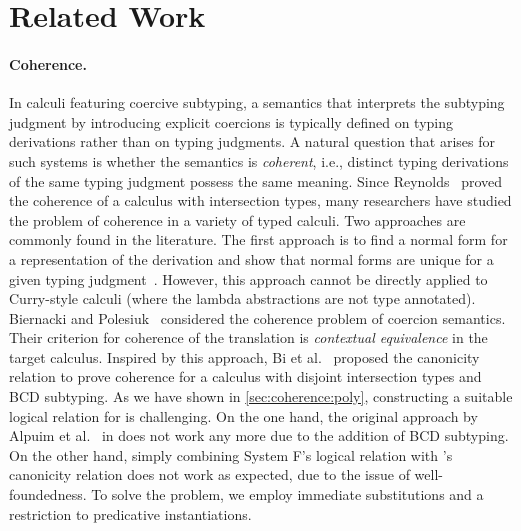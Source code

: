 
\section{Related Work}
\label{sec:related}

\paragraph{Coherence.}

In calculi featuring coercive subtyping, a semantics that interprets the
subtyping judgment by introducing explicit coercions is typically defined on
typing derivations rather than on typing judgments. A natural question that
arises for such systems is whether the semantics is \emph{coherent}, i.e.,
distinct typing derivations of the same typing judgment possess the same
meaning. Since Reynolds~\cite{Reynolds_1991} proved the coherence of a calculus with
intersection types, %
many researchers have studied the problem of coherence in a variety of typed
calculi. Two approaches are commonly found in the literature.
The first approach is to find a normal form for a representation of
the derivation and show that normal forms are unique for a given typing
judgment~\cite{Breazu_Tannen_1991,Curien_1992,SCHWINGHAMMER_2008}.
However, this approach cannot be directly applied to Curry-style
calculi (where the lambda abstractions are not type annotated).
Biernacki and Polesiuk~\cite{biernacki2015logical} considered the coherence
problem of coercion semantics. Their criterion for coherence of the translation
is \emph{contextual equivalence} in the target calculus. %
Inspired by this approach, Bi et al.~\cite{bi_et_al:LIPIcs:2018:9227} proposed the canonicity relation
to prove coherence for a calculus with disjoint intersection types and BCD
subtyping. As we have shown in \cref{sec:coherence:poly}, constructing a
suitable logical relation for \fnamee is challenging. On the one hand, the
original approach by Alpuim et al.~\cite{alpuimdisjoint} in \fname does not work
any more due to the addition of BCD subtyping. On the other hand, simply
combining System F's logical relation with \namee's canonicity relation does not
work as expected, due to the issue of well-foundedness. To solve the problem, we
employ immediate substitutions and a restriction to predicative instantiations.




